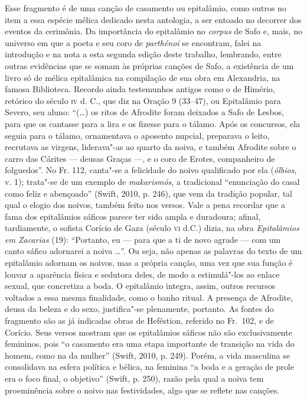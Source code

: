 {\small Esse fragmento é de uma canção de casamento ou epitalâmio, como outros no item a essa espécie mélica dedicado nesta antologia, a ser entoado no decorrer dos eventos da cerimônia.
Da importância do epitalâmio no \textit{corpus} de Safo e, mais, no universo em que a poeta e seu coro de \textit{parthénoi} se encontram, falei na introdução e na nota a esta segunda edição deste trabalho, lembrando, entre outras evidências que se somam às próprias canções de Safo, a existência de um livro só de mélica epitalâmica na compilação de sua obra  em Alexandria, na famosa Biblioteca. Recordo ainda testemunhos antigos como o de Himério, retórico do século \textsc{iv} d. C., que diz na Oração 9 (33--47), ou Epitalâmio para Severo, seu aluno: ``(\ldots{}) os ritos de Afrodite foram deixados a Safo de Lesbos, para que os cantasse para a lira e os fizesse para o tálamo. Após os concursos, ela seguia para o tálamo, ornamentava o aposento nupcial, preparava o leito, recrutava as virgens, liderava"-as ao quarto da noiva, e também Afrodite sobre o carro das Cárites --- deusas Graças ---, e o coro de Erotes, companheiro de folguedos''.
No Fr. 112, canta"-se a felicidade do noivo qualificado por ela (\textit{ólbios}, v. 1); trata"-se de um exemplo de \textit{makarismós}, a tradicional “enunciação do casal como feliz e abençoado” (Swift, 2010, p. 246), que vem da tradição popular, tal qual o elogio dos noivos, também feito nos versos.
Vale a pena recordar que a fama dos epitalâmios sáficos parece ter
sido ampla e duradoura; afinal, tardiamente, o sofista Corício de Gaza (século
\textsc{vi} d.C.) dizia, na obra \textit{Epitalâmios em Zacarias} (19): ``Portanto, eu
--- para que a ti de novo agrade --- com um canto sáfico adornarei a noiva \ldots{}”.
Ou seja, não apenas as palavras do texto de um epitalâmio adornam os noivos,
mas a própria canção, uma vez que sua função é louvar a aparência física e
sedutora deles, de modo a estimulá"-los ao enlace sexual, que concretiza a
boda. O epitalâmio integra, assim, outros recursos voltados a essa mesma finalidade,
como o banho ritual. A presença de Afrodite, deusa da beleza e do sexo,
justifica"-se plenamente, portanto. As fontes do fragmento são as já indicadas
obras de Heféstion, referido no Fr.~102, e de Corício.
Seus versos mostram que os epitalâmios sáficos não são exclusivamente femininos, pois “o casamento era uma etapa importante de transição na vida do homem, como na da mulher” (Swift, 2010, p. 249). Porém, a vida masculina se consolidava na esfera política e bélica, na feminina  “a boda e a geração de prole era o foco final, o objetivo” (Swift, p. 250), razão pela qual a noiva tem proeminência sobre o noivo nas festividades, algo que se reflete nas canções.}

